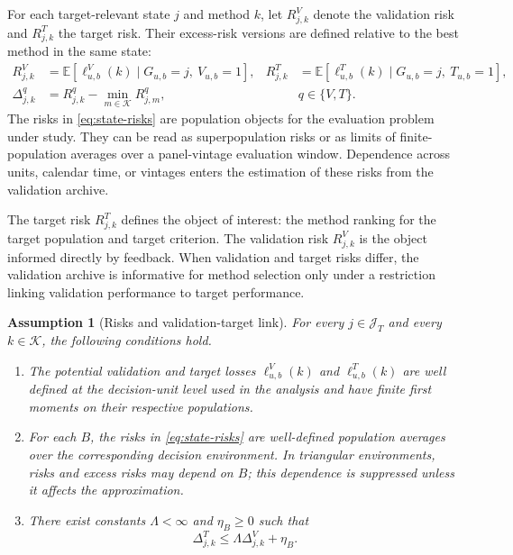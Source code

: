 \documentclass[a4paper, 12pt]{article}
\theoremstyle{plain}
\newtheorem{assumption}{Assumption}
\theoremstyle{remark}
\newcommand{\E}{\mathbb{E}}
\newcommand{\Kcal}{\mathcal{K}}
\newcommand{\1}{\mathbf{1}}
\begin{document}
For each target-relevant state \(j\) and method \(k\), let \(R^V_{j,k}\) denote the validation risk and \(R^T_{j,k}\) the target risk. Their excess-risk versions are defined relative to the best method in the same state:
\begin{equation}
\label{eq:state-risks}
\begin{aligned}
    R^V_{j,k}
    &=
    \E\!\left[\ell^V_{u,b}(k)\mid G_{u,b}=j,\ V_{u,b}=1\right],
    &
    R^T_{j,k}
    &=
    \E\!\left[\ell^T_{u,b}(k)\mid G_{u,b}=j,\ T_{u,b}=1\right],
    \\
    \Delta^q_{j,k}
    &=
    R^q_{j,k}-\min_{m\in\Kcal}R^q_{j,m},
    && q\in\{V,T\} .
\end{aligned}
\end{equation}
The risks in \eqref{eq:state-risks} are population objects for the evaluation problem under study. They can be read as superpopulation risks or as limits of finite-population averages over a panel-vintage evaluation window. Dependence across units, calendar time, or vintages enters the estimation of these risks from the validation archive.

The target risk \(R^T_{j,k}\) defines the object of interest: the method ranking for the target population and target criterion. The validation risk \(R^V_{j,k}\) is the object informed directly by feedback. When validation and target risks differ, the validation archive is informative for method selection only under a restriction linking validation performance to target performance.

\begin{assumption}[Risks and validation-target link]
\label{ass:validation-target-link}
For every \(j\in\mathcal J_T\) and every \(k\in\Kcal\), the following conditions hold.
\begin{enumerate}[label=(\alph*), leftmargin=*]
    \item The potential validation and target losses \(\ell^V_{u,b}(k)\) and \(\ell^T_{u,b}(k)\) are well defined at the decision-unit level used in the analysis and have finite first moments on their respective populations.
    \item For each \(B\), the risks in \eqref{eq:state-risks} are well-defined population averages over the corresponding decision environment. In triangular environments, risks and excess risks may depend on \(B\); this dependence is suppressed unless it affects the approximation.
    \item There exist constants \(\Lambda<\infty\) and \(\eta_B\geq0\) such that
    \begin{equation}
    \label{eq:validation-target-link}
        \Delta^T_{j,k}\leq \Lambda\Delta^V_{j,k}+\eta_B .
    \end{equation}
\end{enumerate}
\end{assumption}
\end{document}
